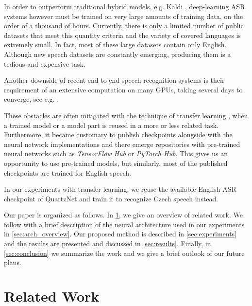 In order to outperform traditional hybrid models, e.g. Kaldi , deep-learning ASR systems however must be trained on very large amounts of training data, on the order of a thousand of hours. Currently, there is only a limited number of public datasets that meet this quantity criteria and the variety of covered languages is extremely small. In fact, most of these large datasets contain only English. Although new speech datasets are constantly emerging, producing them is a tedious and expensive task.

Another downside of recent end-to-end speech recognition systems is their requirement of an extensive computation on many GPUs, taking several days to converge, see e.g. . 

These obstacles 
are often mitigated with the technique of transfer learning , when a trained model or a model part is reused in a more or less related task.
Furthermore, it became customary to publish checkpoints alongside with the neural network implementations and 
there emerge repositories with pre-trained neural networks such as \textit{TensorFlow Hub} or \textit{PyTorch
Hub}. This gives us an opportunity to use pre-trained models, but similarly, most of the published checkpoints are trained for English speech.

In our experiments with transfer learning, 
we reuse the available English ASR checkpoint of QuartzNet  and train it to recognize Czech speech instead.


Our paper is organized as follows. In \cref{sec:related_work}, we give an overview of related work. We follow with a brief description of the neural architecture used in our experiments in \cref{sec:arch_overview}.
Our proposed method is described in \cref{sec:experiments} and the results are presented and discussed in \cref{sec:results}.
Finally, in \cref{sec:conclusion} we summarize the work and we give a brief outlook of our future plans.


\section{Related Work}
\label{sec:related_work}

